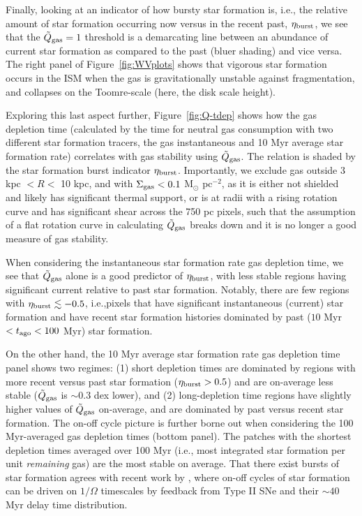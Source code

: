 \documentclass[usletter,fleqn,usenatbib]{mnras}
\begin{document}
Finally, looking at an indicator of how bursty star formation is, i.e., the relative amount of star formation occurring now versus in the recent past, $\eta_{\rm burst}$, we see that the $\tilde Q_{\rm gas} = 1$ threshold is a demarcating line between an abundance of current star formation as compared to the past (bluer shading) and vice versa.  The right panel of Figure~\ref{fig:WVplots} shows that vigorous star formation occurs in the ISM when the gas is gravitationally unstable against fragmentation, and collapses on the Toomre-scale (here, the disk scale height).

Exploring this last aspect further, Figure~\ref{fig:Q-tdep} shows how the gas depletion time (calculated by the time for neutral gas consumption with two different star formation tracers, the gas instantaneous and 10 Myr average star formation rate) correlates with gas stability using  $\tilde Q_{\rm gas}$.  The relation is shaded by the star formation burst indicator $\eta_{\rm burst}$.  Importantly, we exclude gas outside 3 kpc $< R <$ 10 kpc, and with $\Sigma_{\rm gas} < 0.1$ M$_\odot$ pc$^{-2}$, as it is either not shielded and likely has significant thermal support, or is at radii with a rising rotation curve and has significant shear across the 750 pc pixels, such that the assumption of a flat rotation curve in calculating $\tilde Q_{\rm gas}$ breaks down and it is no longer a good measure of gas stability.

When considering the instantaneous star formation rate gas depletion time, we see that $\tilde Q_{\rm gas}$ alone is a good predictor of $\eta_{\rm burst}$, with less stable regions having significant current relative to past star formation.  Notably, there are few regions with $\eta_{\rm burst}  \lesssim -0.5$, i.e.,pixels that have significant instantaneous (current) star formation and have recent star formation histories dominated by past ($10$ Myr$ < t_{\rm ago} < 100$ Myr) star formation.

On the other hand, the 10 Myr average star formation rate gas depletion time panel shows two regimes: (1) short depletion times are dominated by regions with more recent versus past star formation ($\eta_{\rm burst} > 0.5$) and are on-average less stable ($\tilde Q_{\rm gas}$ is $\sim 0.3$ dex lower), and (2) long-depletion time regions have slightly higher values of $\tilde Q_{\rm gas}$ on-average, and are dominated by past versus recent star formation.  The on-off cycle picture is further borne out when considering the 100 Myr-averaged gas depletion times (bottom panel).  The patches with the shortest depletion times averaged over 100 Myr (i.e., most integrated star formation per unit \emph{remaining} gas) are the most stable on average.  That there exist bursts of star formation agrees with recent work by \citet{Orr2019}, where on-off cycles of star formation can be driven on $1/\Omega$ timescales by feedback from Type II SNe and their $\sim 40$ Myr delay time distribution.
\end{document}
